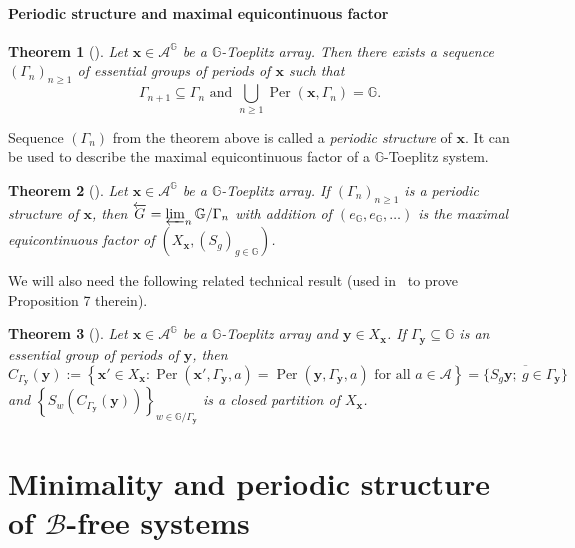 \documentclass[leqno,a4paper,12pt]{article}
\newtheorem{Th}{Theorem}[section]
\theoremstyle{definition}
\newcommand{\G}{\mathbb{G}}
\newcommand{\cA}{\mathcal{A}}
\newcommand{\sB}{\mathscr{B}}
\begin{document}
\paragraph{Periodic structure and maximal equicontinuous factor}
\begin{Th}[{\cite[Corollary 6]{MR2427048}}]\label{tw_essential}
Let $\bm{x} \in \mathcal{A}^{\G}$ be a $\G$-Toeplitz array. Then there exists a sequence $\left(\Gamma_{n}\right)_{n \geq 1}$ of essential groups of periods of $\bm{x}$ such that
\[
\Gamma_{n+1} \subseteq \Gamma_{n}\text{ and }\bigcup_{n\geq1} \operatorname{Per}\left(\bm{x}, \Gamma_{n}\right)=\G.
\]
\end{Th}
Sequence $(\Gamma_n)$ from the theorem above is called a \emph{periodic structure} of $\bm{x}$. It can be used to describe the maximal equicontinuous factor of a $\G$-Toeplitz system.
\begin{Th}[{\cite[Proposition 7]{MR2427048}}]
Let $\bm{x} \in \mathcal{A}^{\G}$ be a $\G$-Toeplitz array. If $\left(\Gamma_{n}\right)_{n\geq1}$ is a periodic structure of $\bm{x}$, then $\overleftarrow{G}=\varprojlim_{ n}\G / \Gamma_{n}$ with addition of $(e_\G,e_\G,\ldots)$ is the maximal equicontinuous factor of $\left(X_{\bm{x}}, (S_g)_{g\in\G}\right)$.
\end{Th}
We will also need the following related technical result (used in~\cite{MR2427048} to prove Proposition 7 therein).
\begin{Th}[{\cite[Proposition 6, Remark 2]{MR2427048}}]\label{structure}
Let $\bm{x} \in \mathcal{A}^{\G}$ be a $\G$-Toeplitz array and $\bm{y} \in X_{\bm{x}}$. If $\Gamma_{\bm{y}} \subseteq \G$ is an essential group of periods of $\bm{y}$, then
\[
C_{\Gamma_{\bm{y}}}(\bm{y}):=\left\{\bm{x}' \in X_{\bm{x}} : \operatorname{Per}\left(\bm{x}', \Gamma_{\bm{y}}, a\right)=\operatorname{Per}(\bm{y}, \Gamma_{\bm{y}}, a) \text{ for all } a \in \cA\right\}=\overline{\{S_g\bm{y};\ g\in\Gamma_{\bm{y}}\}}
\]
and $\left\{S_w (C_{\Gamma_{\bm{y}}}(\bm{y}))\right\}_{w \in \G / \Gamma_{\bm{y}}}$ is a closed partition of $X_{\bm{x}}$.
\end{Th}

\section{Minimality and periodic structure of $\sB$-free systems}\label{se3}
\end{document}
